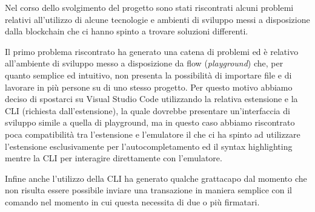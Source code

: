 Nel corso dello svolgimento del progetto sono stati riscontrati alcuni problemi relativi all'utilizzo di alcune tecnologie e ambienti di sviluppo messi a disposizione dalla blockchain che ci hanno spinto a trovare soluzioni differenti. 

Il primo problema riscontrato ha generato una catena di problemi ed è relativo all'ambiente di sviluppo messo a disposizione da flow (\textit{playground}) che, per quanto semplice ed intuitivo, non presenta la possibilità di importare file e di lavorare in più persone su di uno stesso progetto. Per questo motivo abbiamo deciso di spostarci su Visual Studio Code utilizzando la relativa estensione e la CLI (richiesta dall'estensione), la quale dovrebbe presentare un'interfaccia di sviluppo simile a quella di playground, ma in questo caso abbiamo riscontrato poca compatibilità tra l'estensione e l'emulatore il che ci ha spinto ad utilizzare l'estensione esclusivamente per l'autocompletamento ed il syntax highlighting mentre la CLI per interagire direttamente con l'emulatore.

Infine anche l'utilizzo della CLI ha generato qualche grattacapo dal momento che non risulta essere possibile inviare una transazione in maniera semplice con il comando  nel momento in cui questa necessita di due o più firmatari.